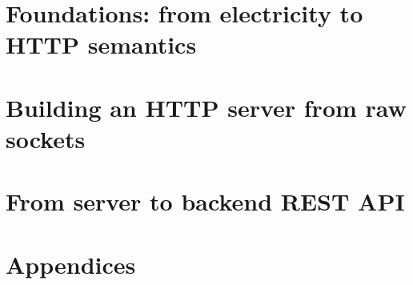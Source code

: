 \documentclass[11pt,a4paper,twoside,openany]{memoir}
\begin{document}
\frontmatter

\tableofcontents*

\mainmatter
\part{Foundations: from electricity to HTTP semantics}








\part{Building an HTTP server from raw sockets}









\part{From server to backend REST API}






\appendix
\part{Appendices}





\backmatter

\end{document}

